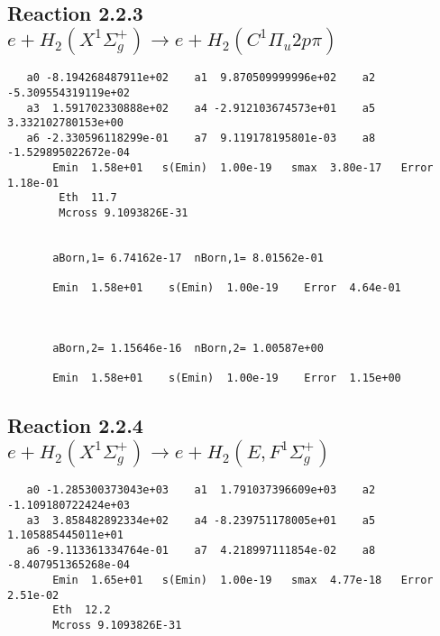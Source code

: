 \documentclass[12pt,dvipdfmx]{article}
\begin{document}
\newpage
\subsection{
Reaction 2.2.3 $e + H_2(X^1\Sigma_g^+) \rightarrow e + H_2(C^1\Pi_u2p\pi) $}














\begin{small}\begin{verbatim}
   a0 -8.194268487911e+02    a1  9.870509999996e+02    a2 -5.309554319119e+02
   a3  1.591702330888e+02    a4 -2.912103674573e+01    a5  3.332102780153e+00
   a6 -2.330596118299e-01    a7  9.119178195801e-03    a8 -1.529895022672e-04
       Emin  1.58e+01   s(Emin)  1.00e-19   smax  3.80e-17   Error  1.18e-01
        Eth  11.7
        Mcross 9.1093826E-31


       aBorn,1= 6.74162e-17  nBorn,1= 8.01562e-01

       Emin  1.58e+01    s(Emin)  1.00e-19    Error  4.64e-01



       aBorn,2= 1.15646e-16  nBorn,2= 1.00587e+00

       Emin  1.58e+01    s(Emin)  1.00e-19    Error  1.15e+00
\end{verbatim}\end{small}




\newpage
\subsection{
Reaction 2.2.4 $e + H_2(X^1\Sigma_g^+) \rightarrow e + H_2(E,F^1\Sigma_g^+)$}














\begin{small}\begin{verbatim}
   a0 -1.285300373043e+03    a1  1.791037396609e+03    a2 -1.109180722424e+03
   a3  3.858482892334e+02    a4 -8.239751178005e+01    a5  1.105885445011e+01
   a6 -9.113361334764e-01    a7  4.218997111854e-02    a8 -8.407951365268e-04
       Emin  1.65e+01   s(Emin)  1.00e-19   smax  4.77e-18   Error  2.51e-02
       Eth  12.2
       Mcross 9.1093826E-31
\end{verbatim}\end{small}
\end{document}
